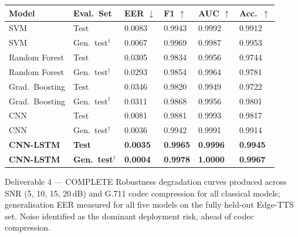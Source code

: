 \documentclass[12pt,a4paper]{report}
\begin{document}
\begin{center}
\begin{tabular}{L{2.6cm}L{2.6cm}C{1.3cm}C{1.2cm}C{1.2cm}C{1.2cm}}
  \toprule
  \color{white}\textbf{Model} &
  \color{white}\textbf{Eval.\ Set} &
  \color{white}\textbf{EER $\downarrow$} &
  \color{white}\textbf{F1 $\uparrow$} &
  \color{white}\textbf{AUC $\uparrow$} &
  \color{white}\textbf{Acc.\ $\uparrow$} \\
  \midrule
  SVM & Test & 0.0083 & 0.9943 & 0.9992 & 0.9912 \\
  SVM & Gen.\ test$^\dagger$ & 0.0067 & 0.9969 & 0.9987 & 0.9953 \\
  Random Forest & Test & 0.0305 & 0.9834 & 0.9956 & 0.9744 \\
  Random Forest & Gen.\ test$^\dagger$ & 0.0293 & 0.9854 & 0.9964 & 0.9781 \\
  Grad.\ Boosting & Test & 0.0346 & 0.9820 & 0.9949 & 0.9722 \\
  Grad.\ Boosting & Gen.\ test$^\dagger$ & 0.0311 & 0.9868 & 0.9956 & 0.9801 \\
  CNN & Test & 0.0081 & 0.9881 & 0.9993 & 0.9817 \\
  CNN & Gen.\ test$^\dagger$ & 0.0036 & 0.9942 & 0.9991 & 0.9914 \\
  \textbf{CNN-LSTM} & \textbf{Test} & \textbf{0.0035} & \textbf{0.9965} & \textbf{0.9996} & \textbf{0.9945} \\
  \textbf{CNN-LSTM} & \textbf{Gen.\ test$^\dagger$} & \textbf{0.0004} & \textbf{0.9978} & \textbf{1.0000} & \textbf{0.9967} \\
  \bottomrule
\end{tabular}
\label{tab:results}
\end{center}

\begin{deliverablebox}{Deliverable 4 --- COMPLETE}
  Robustness degradation curves produced across SNR (5, 10, 15, 20\,dB) and G.711
  codec compression for all classical models; generalisation EER measured for all five
  models on the fully held-out Edge-TTS set. Noise identified as the dominant deployment
  risk, ahead of codec compression.
\end{deliverablebox}

\end{document}
